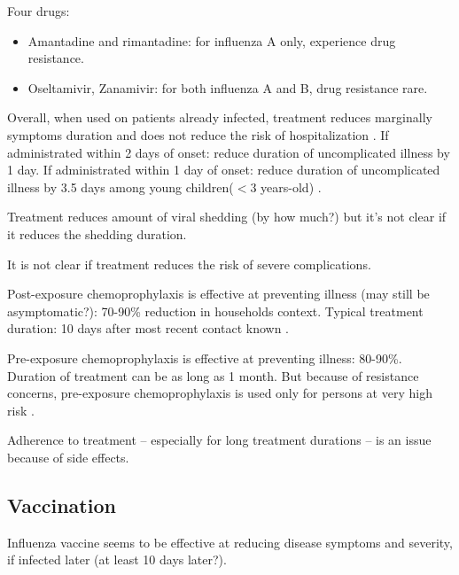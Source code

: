 \documentclass[11pt, onecolumn]{article}
\begin{document}
Four drugs: 
\begin{itemize}
\item Amantadine and rimantadine: for influenza A only, experience drug resistance.
\item Oseltamivir, Zanamivir: for both influenza A and B, drug resistance rare.
\end{itemize}

Overall, when used on patients already infected, treatment reduces marginally symptoms duration and does not reduce the risk of hospitalization \cite{Ebell:2014ic,Jefferson:2014ei}. 
If administrated within 2 days of onset: reduce duration of uncomplicated illness by 1 day.
If administrated within 1 day of onset: reduce duration of uncomplicated illness by 3.5 days among young children($<3$ years-old) \cite{CDC:2011wq}.

Treatment reduces amount of viral shedding (by how much?) but it's not clear if it reduces the shedding duration.

It is not clear if treatment reduces the risk of severe complications.

Post-exposure chemoprophylaxis is effective at preventing illness (may still be asymptomatic?): 70-90\% reduction in households context. Typical treatment duration: 10 days after most recent contact known \cite{CDC:2011wq}.

Pre-exposure chemoprophylaxis is effective at preventing illness: 80-90\%. Duration of treatment can be as long as 1 month. But because of resistance concerns, pre-exposure chemoprophylaxis is used only for persons at very high risk \cite{CDC:2011wq}. 

Adherence to treatment -- especially for long treatment durations -- is an issue because of side effects.



\subsection{Vaccination}

Influenza vaccine seems to be effective at reducing disease symptoms and severity, if infected later (at least 10 days later?).








\end{document}
